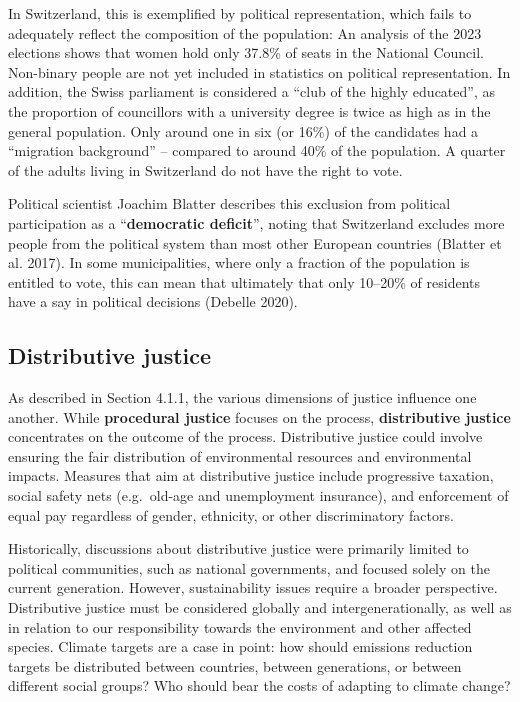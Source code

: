\documentclass[
  a4paper,
  DIV=11,
  numbers=noendperiod,
  oneside,
  openany]{scrreprt}
\begin{document}
In Switzerland, this is exemplified by political representation, which
fails to adequately reflect the composition of the population: An
analysis of the 2023 elections shows that women hold only 37.8\% of
seats in the National Council. Non-binary people are not yet included in
statistics on political representation. In addition, the Swiss
parliament is considered a ``club of the highly educated'', as the
proportion of councillors with a university degree is twice as high as
in the general population. Only around one in six (or 16\%) of the
candidates had a ``migration background'' -- compared to around 40\% of
the population. A quarter of the adults living in Switzerland do not
have the right to vote.

Political scientist Joachim Blatter describes this exclusion from
political participation as a ``\textbf{democratic deficit}'', noting
that Switzerland excludes more people from the political system than
most other European countries (Blatter et al. 2017). In some
municipalities, where only a fraction of the population is entitled to
vote, this can mean that ultimately that only 10--20\% of residents have
a say in political decisions (Debelle 2020).

\subsection{Distributive justice}\label{distributive-justice}

As described in Section 4.1.1, the various dimensions of justice
influence one another. While \textbf{procedural justice} focuses on the
process, \textbf{distributive justice} concentrates on the outcome of
the process. Distributive justice could involve ensuring the fair
distribution of environmental resources and environmental impacts.
Measures that aim at distributive justice include progressive taxation,
social safety nets (e.g.~old-age and unemployment insurance), and
enforcement of equal pay regardless of gender, ethnicity, or other
discriminatory factors.

Historically, discussions about distributive justice were primarily
limited to political communities, such as national governments, and
focused solely on the current generation. However, sustainability issues
require a broader perspective. Distributive justice must be considered
globally and intergenerationally, as well as in relation to our
responsibility towards the environment and other affected species.
Climate targets are a case in point: how should emissions reduction
targets be distributed between countries, between generations, or
between different social groups? Who should bear the costs of adapting
to climate change?
\end{document}

